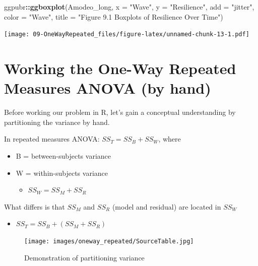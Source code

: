 \documentclass[
  11pt,
]{book}
\newenvironment{Shaded}{\begin{snugshade}}{\end{snugshade}}
\newcommand{\AttributeTok}[1]{\textcolor[rgb]{0.27,0.27,0.27}{#1}}
\newcommand{\FunctionTok}[1]{\textcolor[rgb]{0.27,0.27,0.27}{\textbf{#1}}}
\newcommand{\NormalTok}[1]{#1}
\newcommand{\SpecialCharTok}[1]{\textcolor[rgb]{0.43,0.43,0.43}{\textbf{#1}}}
\newcommand{\StringTok}[1]{\textcolor[rgb]{0.5,0.5,0.5}{#1}}
\providecommand{\tightlist}{%
  \setlength{\itemsep}{0pt}\setlength{\parskip}{0pt}}
\begin{document}
\begin{Shaded}
\begin{Highlighting}[]
\NormalTok{ggpubr}\SpecialCharTok{::}\FunctionTok{ggboxplot}\NormalTok{(Amodeo\_long, }\AttributeTok{x =} \StringTok{"Wave"}\NormalTok{, }\AttributeTok{y =} \StringTok{"Resilience"}\NormalTok{, }\AttributeTok{add =} \StringTok{"jitter"}\NormalTok{,}
    \AttributeTok{color =} \StringTok{"Wave"}\NormalTok{, }\AttributeTok{title =} \StringTok{"Figure 9.1 Boxplots of Resilience Over Time"}\NormalTok{)}
\end{Highlighting}
\end{Shaded}

\texttt{[image: 09-OneWayRepeated\_files/figure-latex/unnamed-chunk-13-1.pdf]}

\hypertarget{working-the-one-way-repeated-measures-anova-by-hand}{%
\section{Working the One-Way Repeated Measures ANOVA (by hand)}\label{working-the-one-way-repeated-measures-anova-by-hand}}

Before working our problem in R, let's gain a conceptual understanding by partitioning the variance by hand.

In repeated measures ANOVA: \(SS_T = SS_B + SS_W\), where

\begin{itemize}
\tightlist
\item
  B = between-subjects variance
\item
  W = within-subjects variance

  \begin{itemize}
  \tightlist
  \item
    \(SS_W = SS_M + SS_R\)
  \end{itemize}
\end{itemize}

What differs is that \(SS_M\) and \(SS_R\) (model and residual) are located in \(SS_W\)

\begin{itemize}
\tightlist
\item
  \(SS_T = SS_B + (SS_M + SS_R)\)
\end{itemize}

\begin{figure}
\centering
\texttt{[image: images/oneway\_repeated/SourceTable.jpg]}
\caption{Demonstration of partitioning variance}
\end{figure}
\end{document}
